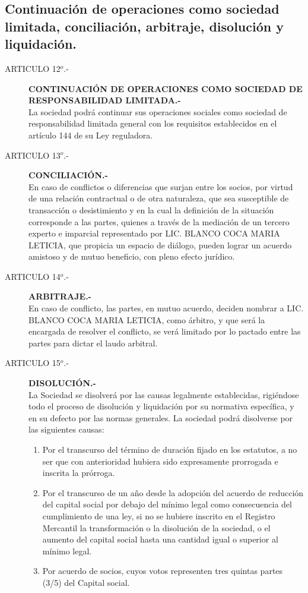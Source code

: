 \documentclass[11pt,letterpaper]{report}
\begin{document}
\subsection{ Continuaci\'on de operaciones como sociedad limitada, conciliaci\'on, arbitraje, disoluci\'on y liquidaci\'on. }

\begin{description}
\item[ARTICULO 12$^{o}$.-]{\bf CONTINUACI\'ON DE OPERACIONES COMO SOCIEDAD DE RESPONSABILIDAD
LIMITADA.-}\\
La sociedad podr\'a continuar sus operaciones sociales como sociedad de responsabilidad limitada general con los requisitos establecidos en el art\'iculo 144 de su Ley reguladora.

\item[ARTICULO 13$^{o}$.-]{\bf CONCILIACI\'ON.- }\\ En caso de conflictos o diferencias que surjan entre los socios, por virtud de una relaci\'on contractual o de otra naturaleza, que sea susceptible de transacci\'on o desistimiento y en la cual la definici\'on de la situaci\'on corresponde a las partes, quienes a trav\'es de la mediaci\'on de un tercero experto e imparcial representado por LIC. BLANCO COCA MARIA LETICIA, que propicia un espacio de di\'alogo, pueden lograr un acuerdo amistoso y de mutuo beneficio, con pleno efecto jur\'idico.\\
\item[ARTICULO 14$^{o}$.-]{\bf ARBITRAJE.- }\\ En caso de conflicto, las partes, en mutuo acuerdo, deciden nombrar a LIC. BLANCO COCA MARIA LETICIA, como \'arbitro, y que ser\'a la encargada de resolver el conflicto, se ver\'a limitado por lo pactado entre las partes para dictar el laudo arbitral.

\item[ARTICULO 15$^{o}$.-]{\bf DISOLUCI\'ON.-}\\La Sociedad se disolver\'a por las causas legalmente establecidas, rigi\'endose todo el proceso de disoluci\'on y liquidaci\'on por su normativa espec\'ifica, y en su defecto por las normas generales. La sociedad podr\'a disolverse por las siguientes causas:
\begin{enumerate}
\item Por el transcurso del t\'ermino de duraci\'on fijado en los estatutos, a no ser que con anterioridad hubiera sido expresamente prorrogada e inscrita la pr\'orroga.
\item Por el transcurso de un a\~no desde la adopci\'on del acuerdo de reducci\'on del capital social por debajo del m\'inimo legal como consecuencia del cumplimiento de una ley, si no se hubiere inscrito en el Registro Mercantil la transformaci\'on o la disoluci\'on de la sociedad, o el aumento del capital social hasta una cantidad igual o superior al m\'inimo legal.
\item Por acuerdo de socios, cuyos votos representen tres quintas partes (3/5) del Capital social.
\end{enumerate}


\end{description}
\end{document}
